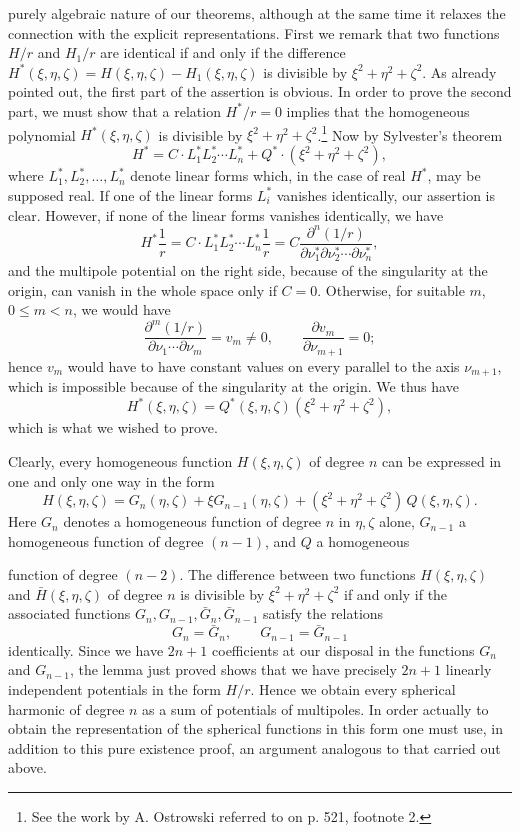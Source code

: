 purely algebraic nature of our theorems, although at the same time it relaxes the connection with the explicit representations. First we remark that two functions $H/r$ and $H_1/r$ are identical if and only if the difference $H^*(\xi,\eta,\zeta)=H(\xi,\eta,\zeta)-H_1(\xi,\eta,\zeta)$ is divisible by $\xi^2+\eta^2+\zeta^2$. As already pointed out, the first part of the assertion is obvious. In order to prove the second part, we must show that a relation $H^*/r=0$ implies that the homogeneous polynomial $H^*(\xi,\eta,\zeta)$ is divisible by $\xi^2+\eta^2+\zeta^2$.\footnote{See the work by A. Ostrowski referred to on p. 521, footnote 2.} Now by Sylvester's theorem
\begin{equation}\tag{83}
H^*=C\cdot L_1^*L_2^*\cdots L_n^*+Q^*\cdot(\xi^2+\eta^2+\zeta^2),
\end{equation}
where $L_1^*,L_2^*,\ldots,L_n^*$ denote linear forms which, in the case of real $H^*$, may be supposed real. If one of the linear forms $L_i^*$ vanishes identically, our assertion is clear. However, if none of the linear forms vanishes identically, we have
\[
H^*\frac1r=C\cdot L_1^*L_2^*\cdots L_n^*\frac1r
=C\frac{\partial^n(1/r)}{\partial\nu_1^*\partial\nu_2^*\cdots\partial\nu_n^*},
\]
and the multipole potential on the right side, because of the singularity at the origin, can vanish in the whole space only if $C=0$. Otherwise, for suitable $m$, $0\le m<n$, we would have
\[
\frac{\partial^m(1/r)}{\partial\nu_1\cdots\partial\nu_m}=v_m\ne0,
\qquad
\frac{\partial v_m}{\partial\nu_{m+1}}=0;
\]
hence $v_m$ would have to have constant values on every parallel to the axis $\nu_{m+1}$, which is impossible because of the singularity at the origin. We thus have
\[
H^*(\xi,\eta,\zeta)=Q^*(\xi,\eta,\zeta)(\xi^2+\eta^2+\zeta^2),
\]
which is what we wished to prove.

Clearly, every homogeneous function $H(\xi,\eta,\zeta)$ of degree $n$ can be expressed in one and only one way in the form
\begin{equation}\tag{84}
H(\xi,\eta,\zeta)=G_n(\eta,\zeta)+\xi G_{n-1}(\eta,\zeta)
+(\xi^2+\eta^2+\zeta^2)\,Q(\xi,\eta,\zeta).
\end{equation}
Here $G_n$ denotes a homogeneous function of degree $n$ in $\eta,\zeta$ alone, $G_{n-1}$ a homogeneous function of degree $(n-1)$, and $Q$ a homogeneous

function of degree $(n-2)$. The difference between two functions $H(\xi,\eta,\zeta)$ and $\bar H(\xi,\eta,\zeta)$ of degree $n$ is divisible by $\xi^2+\eta^2+\zeta^2$ if and only if the associated functions $G_n,G_{n-1},\bar G_n,\bar G_{n-1}$ satisfy the relations
\[
G_n=\bar G_n,\qquad G_{n-1}=\bar G_{n-1}
\]
identically. Since we have $2n+1$ coefficients at our disposal in the functions $G_n$ and $G_{n-1}$, the lemma just proved shows that we have precisely $2n+1$ linearly independent potentials in the form $H/r$. Hence we obtain every spherical harmonic of degree $n$ as a sum of potentials of multipoles. In order actually to obtain the representation of the spherical functions in this form one must use, in addition to this pure existence proof, an argument analogous to that carried out above.

